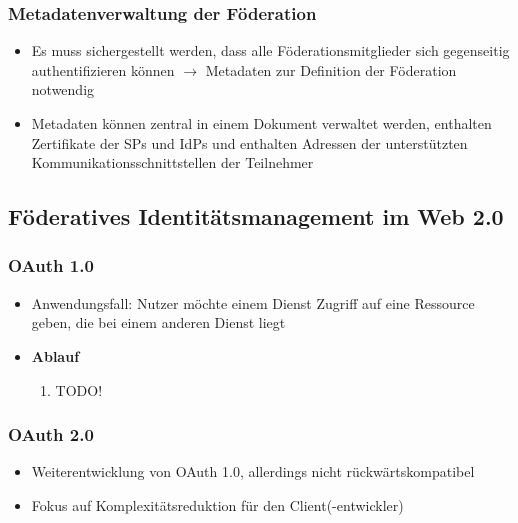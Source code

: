 \subsubsection{Metadatenverwaltung der Föderation}
\begin{itemize}
	\item Es muss sichergestellt werden, dass alle Föderationsmitglieder sich gegenseitig authentifizieren können $\rightarrow$ Metadaten zur Definition der Föderation notwendig
	\item Metadaten können zentral in einem Dokument verwaltet werden, enthalten Zertifikate der SPs und IdPs und enthalten Adressen der unterstützten Kommunikationsschnittstellen der Teilnehmer
\end{itemize}


\subsection{Föderatives Identitätsmanagement im Web 2.0}

\subsubsection{OAuth 1.0}
\begin{itemize}
	\item Anwendungsfall: Nutzer möchte einem Dienst Zugriff auf eine Ressource geben, die bei einem anderen Dienst liegt
	\item \textbf{Ablauf}
	\begin{enumerate}
		\item TODO!
	\end{enumerate}
\end{itemize}

\subsubsection{OAuth 2.0}
\begin{itemize}
	\item Weiterentwicklung von OAuth 1.0, allerdings nicht rückwärtskompatibel
	\item Fokus auf Komplexitätsreduktion für den Client(-entwickler)
\end{itemize}


